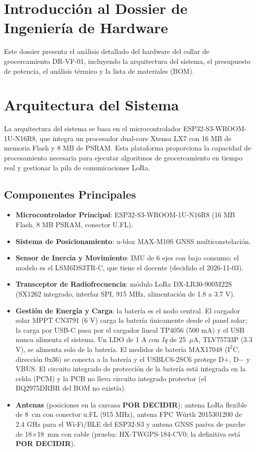 \section{Introducción al Dossier de Ingeniería de Hardware}

Este dossier presenta el análisis detallado del hardware del collar de geocercamiento DR-VF-01, incluyendo la arquitectura del sistema, el presupuesto de potencia, el análisis térmico y la lista de materiales (BOM).

\section{Arquitectura del Sistema}

La arquitectura del sistema se basa en el microcontrolador ESP32-S3-WROOM-1U-N16R8, que integra un procesador dual-core Xtensa LX7 con 16 MB de memoria Flash y 8 MB de PSRAM. Esta plataforma proporciona la capacidad de procesamiento necesaria para ejecutar algoritmos de geocercamiento en tiempo real y gestionar la pila de comunicaciones LoRa.

\subsection{Componentes Principales}

\begin{itemize}[leftmargin=*]
    \item \textbf{Microcontrolador Principal}: ESP32-S3-WROOM-1U-N16R8 (16 MB Flash, 8 MB PSRAM, conector U.FL).
    \item \textbf{Sistema de Posicionamiento}: u-blox MAX-M10S GNSS multiconstelación.
    \item \textbf{Sensor de Inercia y Movimiento}: IMU de 6 ejes con bajo consumo; el modelo es el LSM6DS3TR-C, que tiene el docente (decidido el 2026-11-03).
    \item \textbf{Transceptor de Radiofrecuencia}: módulo LoRa DX-LR30-900M22S (SX1262 integrado, interfaz SPI, 915 MHz, alimentación de 1.8 a 3.7 V).
    \item \textbf{Gestión de Energía y Carga}: la batería es el nodo central. El cargador solar MPPT CN3791 (6 V) carga la batería únicamente desde el panel solar; la carga por USB-C pasa por el cargador lineal TP4056 (500 mA) y el USB nunca alimenta el sistema. Un LDO de 1 A con \textit{Iq} de 25~$\mu$A, TLV75733P (3.3 V), se alimenta solo de la batería. El medidor de batería MAX17048 ($\text{I}^2\text{C}$, dirección 0x36) se conecta a la batería y el USBLC6-2SC6 protege D+, D$-$ y VBUS. El circuito integrado de protección de la batería está integrada en la celda (PCM) y la PCB no lleva circuito integrado protector (el BQ2975DRBR del BOM no existía).
    \item \textbf{Antenas} (posiciones en la carcasa \textbf{POR DECIDIR}): antena LoRa flexible de 8~cm con conector u.FL (915 MHz), antena FPC Würth 2015301200 de 2.4 GHz para el Wi-Fi/BLE del ESP32-S3 y antena GNSS pasiva de parche de 18$\times$18~mm con cable (prueba: HX-TWGPS-184-CV0; la definitiva está \textbf{POR DECIDIR}).
\end{itemize}

